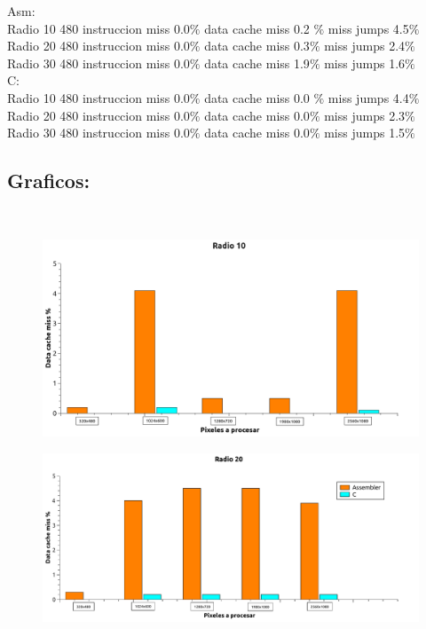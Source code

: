 Asm: \\
	Radio 10 480  	instruccion miss 0.0$\%$  data cache miss  0.2 $\%$ miss jumps  4.5$\%$	\\
	Radio 20 480  instruccion miss 0.0$\%$  data cache miss  0.3$\%$ miss jumps 2.4$\%$	\\
	Radio 30 480  	instruccion miss 0.0$\%$  data cache miss  1.9$\%$ miss jumps   1.6$\%$	\\

C:\\
	Radio 10 480  	instruccion miss  0.0$\%$ data cache miss 0.0 $\%$ miss jumps  4.4$\%$ \\
	Radio 20 480  	instruccion miss  0.0$\%$ data cache miss 0.0$\%$ miss jumps 2.3$\%$ \\
	Radio 30 480  	instruccion miss  0.0$\%$ data cache miss 0.0$\%$ miss jumps  1.5$\%$ \\

\subsection{Graficos:} \\


\begin{figure}[H]
\begin{center}
  \includegraphics[width=\linewidth]{cache/Radio 10.png}
\end{center}
\end{figure}

\begin{figure}[H]
\begin{center}
  \includegraphics[width=\linewidth]{cache/Radio 20.pdf}
\end{center}
\end{figure}

